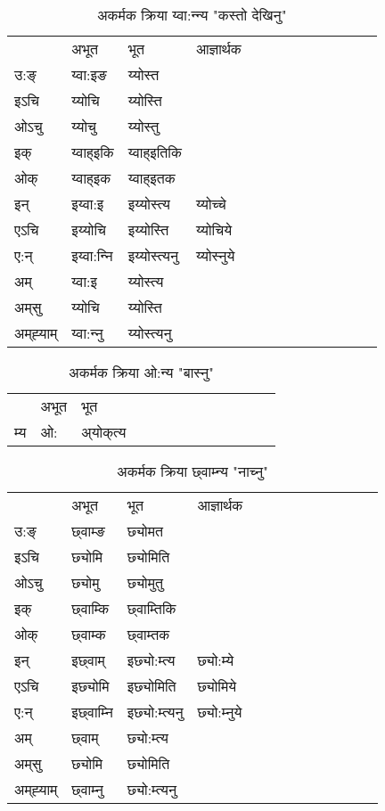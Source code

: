 \begin{table}[H]
\centering
\caption{\label{ot.vi} अकर्मक क्रिया  य्वा:न्‍न्य  "कस्तो देखिनु"  }
\begin{tabular}{l|l|l|l|l|l|l|l|l|l|l|l|l}  \toprule
&अभूत & भूत & आज्ञार्थक \\ 
उ:ङ्‌ &य्वा:इङ &य्योस्त \\ 
इऽचि &य्योचि &य्योस्ति   \\ 
ओऽचु &य्योचु &य्योस्तु   \\ 
इक् &य्वाह्इकि &य्वाह्इतिकि   \\ 
ओक् &य्वाह्इक &य्वाह्इतक   \\ 
इन् & इय्वा:इ & इय्योस्त्य &य्योच्‍चे  \\ 
एऽचि & इय्योचि & इय्योस्ति &य्योचिये    \\ 
ए:न् & इय्वा:न्‍नि  & इय्योस्त्यनु &य्योस्‍नुये  \\ 
अम् & य्वा:इ & य्योस्त्य   \\ 
अम्‌सु & य्योचि & य्योस्ति   \\ 
अम्‌ह्‍याम् & य्वा:न्‍नु  & य्योस्त्यनु \\ 
\bottomrule
\end{tabular}
\end{table}


\begin{table}[H]
\centering
\caption{\label{ok.vi} अकर्मक क्रिया  ओ:न्य  "बास्नु"  }
\begin{tabular}{l|l|l|l|l|l|l|l|l|l|l|l|l}  \toprule
&अभूत & भूत   \\ 
म्य & ओ: & अ्योक्‌त्य   \\ 
\bottomrule
\end{tabular}
\end{table}


\begin{table}[H]
\centering
\caption{\label{om.vi} अकर्मक क्रिया  छ्वाम्‍न्य  "नाच्नु"  }
\begin{tabular}{l|l|l|l|l|l|l|l|l|l|l|l|l}  \toprule
&अभूत & भूत & आज्ञार्थक \\ 
उ:ङ्‌ &छ्वाम्ङ &छ्योमत \\ 
इऽचि &छ्योमि &छ्योमिति   \\ 
ओऽचु &छ्योमु &छ्योमुतु   \\ 
इक् &छ्वाम्कि &छ्वाम्तिकि   \\ 
ओक् &छ्वाम्क &छ्वाम्तक   \\ 
इन् & इछ्वाम् & इछ्यो:म्त्य &छ्यो:म्ये  \\ 
एऽचि & इछ्योमि & इछ्योमिति &छ्योमिये    \\ 
ए:न् & इछ्वाम्‍नि  & इछ्यो:म्त्यनु &छ्यो:म्‍नुये  \\ 
अम् & छ्वाम् & छ्यो:म्त्य   \\ 
अम्‌सु & छ्योमि & छ्योमिति   \\ 
अम्‌ह्‍याम् & छ्वाम्‍नु  & छ्यो:म्त्यनु \\ 
\bottomrule
\end{tabular}
\end{table}


